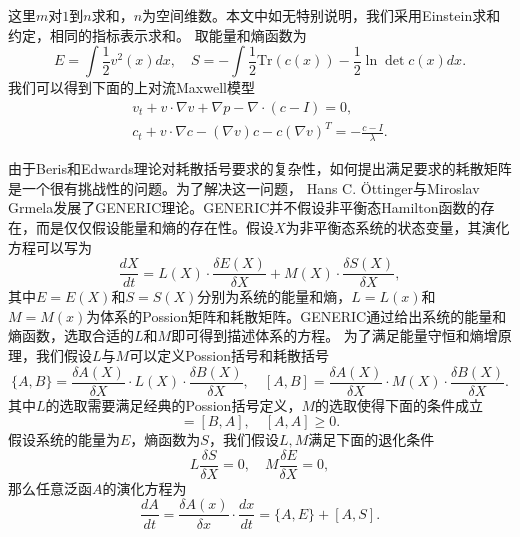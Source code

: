 这里$m$对$1$到$n$求和，$n$为空间维数。本文中如无特别说明，我们采用Einstein求和约定，相同的指标表示求和。
取能量和熵函数为
\begin{equation*}
	E = \int \frac{1}{2} v^2(x)dx, \quad S = -\int \frac{1}{2} \mbox{
 	Tr}(c(x))- \frac{1}{2}  \ln \det c(x) dx.
\end{equation*}
我们可以得到下面的上对流Maxwell模型
\begin{subequations}\label{eq:chap1UCMmaxll}
\begin{align}
	v_t + v \cdot \nabla v + \nabla p  - \nabla \cdot (c - I) = 0, \\
	c_t + v \cdot \nabla c - (\nabla v)c - c (\nabla v)^T = -\frac{c-I}{\lambda}.
\end{align}
\end{subequations}

由于Beris和Edwards理论对耗散括号要求的复杂性，如何提出满足要求的耗散矩阵是一个很有挑战性的问题。为了解决这一问题，
 Hans C. \"Ottinger与Miroslav Grmela发展了GENERIC理论\cite{ottinger2005beyond}。GENERIC并不假设非平衡态Hamilton函数的存在，而是仅仅假设能量和熵的存在性。假设$X$为非平衡态系统的状态变量，其演化方程可以写为
\begin{equation*}
	\frac{dX}{dt} = L(X) \cdot \frac{\delta E(X)}{\delta X} + M(X) \cdot \frac{\delta S(X)}{\delta X} ,
\end{equation*}
其中$E=E(X)$和$S=S(X)$分别为系统的能量和熵，$L=L(x)$和$M=M(x)$为体系的Possion矩阵和耗散矩阵。GENERIC通过给出系统的能量和熵函数，选取合适的$L$和$M$即可得到描述体系的方程。 为了满足能量守恒和熵增原理，我们假设$L$与$M$可以定义Possion括号和耗散括号
\begin{equation*}
	\{ A,B \} = \frac{\delta A(X)}{\delta X} \cdot L(X) \cdot \frac{\delta B(X)}{\delta X}, \quad  [ A,B ] = \frac{\delta A(X)}{\delta X} \cdot M(X) \cdot \frac{\delta B(X)}{\delta X}. 
\end{equation*}
其中$L$的选取需要满足经典的Possion括号定义，$M$的选取使得下面的条件成立
\begin{equation*}
	[A,B] = [B,A], \quad [A,A] \ge 0.
\end{equation*}
假设系统的能量为$E$，熵函数为$S$，我们假设$L,M$满足下面的退化条件
\begin{equation}
	L \frac{\delta S}{\delta X} = 0, \quad M \frac{\delta E}{\delta X} = 0,
\end{equation}
那么任意泛函$A$的演化方程为
 \begin{equation*}
	\frac{d A}{dt} = \frac{\delta A(x)}{\delta x} \cdot \frac{dx}{dt} = \{ A,E\} + [A,S].
\end{equation*}
